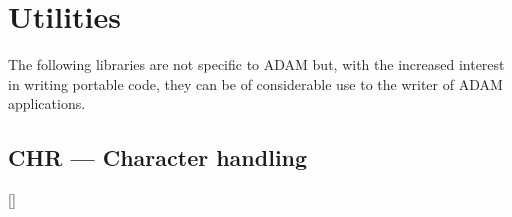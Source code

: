 \newpage

\section{Utilities}

The following libraries are not specific to ADAM but, with the increased
interest in writing portable code, they can be of considerable use to the
writer of ADAM applications.

\subsection{CHR --- Character handling}

\vspace{-9mm}

\hfill []

\vspace{2mm}

